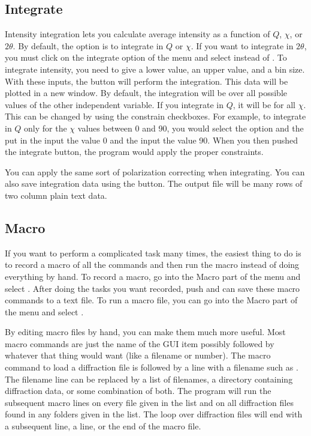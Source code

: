 \subsection{Integrate}

Intensity integration lets you calculate average intensity
as a function of $Q$, $\chi$, or $2\theta$. By default, the
option is to integrate in $Q$ or $\chi$. If you want to 
integrate in $2\theta$, you must click on the integrate 
option of the menu and select  instead
of . To integrate intensity, you need to
give a lower value, an upper value, and a bin size. With 
these inputs, the  button will perform the
integration. This data will be plotted in a new window.
By default, the integration will be over all possible values
of the other independent variable. If you integrate in $Q$,
it will be for all $\chi$. This can be changed by using the
constrain checkboxes. For example, to integrate in $Q$ only
for the $\chi$ values between 0 and 90, you would select the
 option and the put in
the  input the value 0 and the 
input the value 90.  When you then pushed the integrate button, 
the program would apply the proper constraints.

You can apply the same sort of polarization correcting when 
integrating. You can also save integration data using the
 button. The output file will be many rows
of two column plain text data. 

\subsection{Macro}

If you want to perform a complicated task many times, the
easiest thing to do is to record a macro of all the commands
and then run the macro instead of doing everything by hand.
To record a macro, go into the Macro part of the menu and
select . After doing the tasks you
want recorded, push  and can save 
these macro commands to a text file. To run a macro file,
you can go into the Macro part of the menu and select
. 

By editing macro files by hand, you can make them much more
useful. Most macro commands are just the name of the GUI item
possibly followed by whatever that thing would want (like a 
filename or number). The macro command to load a diffraction 
file is  followed by a line with a
filename such as .
The filename line can be replaced by a list of filenames,
a directory containing diffraction data, or some combination
of both. The program will run the subsequent macro lines on
every file given in the list and on all diffraction files found 
in any folders given in the list. The loop over diffraction
files will end with a subsequent  line,
a  line, or the end of the macro file.

